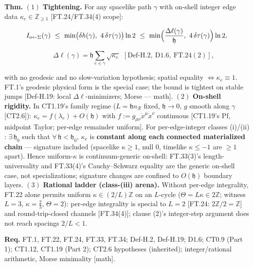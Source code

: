 \begin{theorem}\label{tag:FT-38}
\textbf{Thm.} $(1)$ \textbf{Tightening.} For any spacelike path $\gamma$ with on-shell integer edge data $\kappa_e\in\mathbb Z_{\ge1}$ [FT.24/FT.34(4) scope]:

\[
I_{o\leftarrow\Sigma}(\gamma)\ \le\ \min\bigl(\delta h(\gamma),\ 4\,\delta\tau(\gamma)\bigr)\ln2\ \le\ \min\Bigl(\frac{\Delta\ell(\gamma)}{\mathfrak h},\ 4\,\delta\tau(\gamma)\Bigr)\ln2,
\]

\[
\qquad \Delta\ell(\gamma)=\mathfrak h\sum_{e\in\gamma}\sqrt{\kappa_e}\ \ [\mathrm{Def\text{-}H.2},\ \mathrm{D1.6},\ \mathrm{FT.24}(2)],
\]

with no geodesic and no slow-variation hypothesis; spatial equality $\iff\kappa_e\equiv1$. FT.1's geodesic physical form is the special case; the bound is tightest on stable jumps [Def-H.19: local $\Delta\ell$-minimizers; Morse — math]. $(2)$ \textbf{On-shell rigidity.} In CT1.19's family regime ($L=\mathfrak h n_{\mathcal R}$ fixed, $\mathfrak h\to0$, $g$ smooth along $\gamma$ [CT2.6]): $\kappa_e=f(\lambda_e)+O(\mathfrak h)$ with $f:=g_{\mu\nu}\dot x^\mu\dot x^\nu$ continuous [CT1.19's Pf, midpoint Taylor; per-edge remainder uniform]. For per-edge-integer classes (i)/(ii) : $\exists\,\mathfrak h_0$ such that $\forall\,\mathfrak h<\mathfrak h_0$, $\kappa_e$ is \textbf{constant along each connected materialized chain} — signature included (spacelike $\kappa\ge1$, null $0$, timelike $\kappa\le-1$ are $\ge1$ apart). Hence uniform-$\kappa$ is continuum-generic on-shell: FT.33(3)'s length-universality and FT.33(4)'s Cauchy–Schwarz equality are the generic on-shell case, not specializations; signature changes are confined to $O(\mathfrak h)$ boundary layers. $(3)$ \textbf{Rational ladder (class-(iii) arena).} Without per-edge integrality, FT.22 alone permits uniform $\kappa\in(2/L)\mathbb Z$ on an $L$-cycle ($\Theta=L\kappa\in2\mathbb Z$; witness $L=3$, $\kappa=\tfrac23$, $\Theta=2$): per-edge integrality is special to $L=2$ [FT.24: $2\mathbb Z/2=\mathbb Z$] and round-trip-closed channels [FT.34(4)]; clause (2)'s integer-step argument does not reach spacings $2/L<1$.

\textbf{Req.} FT.1, FT.22, FT.24, FT.33, FT.34; Def-H.2, Def-H.19; D1.6; CT0.9 (Part 1); CT1.12, CT1.19 (Part 2); CT2.6 hypotheses (inherited); integer/rational arithmetic, Morse minimality [math].


\end{theorem}
